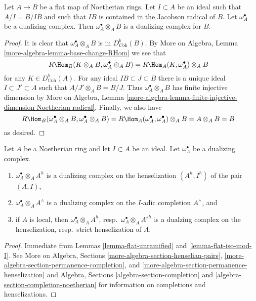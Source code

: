 \begin{lemma}
\label{lemma-flat-iso-mod-I}
Let $A \to B$ be a flat map of Noetherian rings. Let
$I \subset A$ be an ideal such that $A/I = B/IB$ and
such that $IB$ is contained in the Jacobson radical of $B$.
Let $\omega_A^\bullet$ be a dualizing complex.
Then $\omega_A^\bullet \otimes_A B$ is a dualizing
complex for $B$.
\end{lemma}

\begin{proof}
It is clear that $\omega_A^\bullet \otimes_A B$ is in $D^b_{\textit{Coh}}(B)$.
By More on Algebra, Lemma \ref{more-algebra-lemma-base-change-RHom}
we see that
$$
R\Hom_B(K \otimes_A B, \omega_A^\bullet \otimes_A B) =
R\Hom_A(K, \omega_A^\bullet) \otimes_A B
$$
for any $K \in D^b_{\textit{Coh}}(A)$. For any ideal
$IB \subset J \subset B$ there is a unique ideal $I \subset J' \subset A$
such that $A/J' \otimes_A B = B/J$. Thus $\omega_A^\bullet \otimes_A B$
has finite injective dimension by
More on Algebra, Lemma
\ref{more-algebra-lemma-finite-injective-dimension-Noetherian-radical}.
Finally, we also have
$$
R\Hom_B(\omega_A^\bullet \otimes_A B, \omega_A^\bullet \otimes_A B) =
R\Hom_A(\omega_A^\bullet, \omega_A^\bullet) \otimes_A B = A \otimes_A B = B
$$
as desired.
\end{proof}

\begin{lemma}
\label{lemma-completion-henselization-dualizing}
Let $A$ be a Noetherian ring and let $I \subset A$ be an ideal.
Let $\omega_A^\bullet$ be a dualizing complex.
\begin{enumerate}
\item $\omega_A^\bullet \otimes_A A^h$ is a dualizing complex on the
henselization $(A^h, I^h)$ of the pair $(A, I)$,
\item $\omega_A^\bullet \otimes_A A^\wedge$ is a dualizing complex on
the $I$-adic completion $A^\wedge$, and
\item if $A$ is local, then $\omega_A^\bullet \otimes_A A^h$,
resp.\ $\omega_A^\bullet \otimes_A A^{sh}$ is a dualzing complex
on the henselization, resp.\ strict henselization of $A$.
\end{enumerate}
\end{lemma}

\begin{proof}
Immediate from Lemmas \ref{lemma-flat-unramified} and
\ref{lemma-flat-iso-mod-I}.
See More on Algebra, Sections \ref{more-algebra-section-henselian-pairs},
\ref{more-algebra-section-permanence-completion}, and
\ref{more-algebra-section-permanence-henselization} and
Algebra, Sections \ref{algebra-section-completion} and
\ref{algebra-section-completion-noetherian}
for information on completions and henselizations.
\end{proof}

